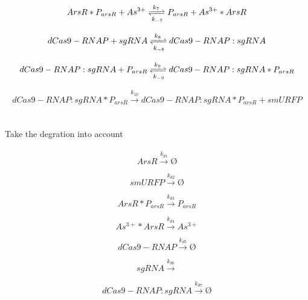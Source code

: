 \begin{equation}
ArsR*P_{arsR} +As^{3+}\xrightleftharpoons[k_{-7}]{k_7}P_{arsR}+ As^{3+}*ArsR
\end{equation}

\begin{equation}
dCas9-RNAP+sgRNA\xrightleftharpoons[k_{-8}]{k_8} dCas9-RNAP:sgRNA
\end{equation}

\begin{equation}
dCas9-RNAP:sgRNA+P_{arsR}\xrightleftharpoons[k_{-9}]{k_9} dCas9-RNAP:sgRNA*P_{arsR}
\end{equation}

\begin{equation}
dCas9-RNAP:sgRNA*P_{arsR}\stackrel{k_{10}}{\longrightarrow} dCas9-RNAP:sgRNA*P_{arsR}+smURFP
\end{equation}
\\\\
Take the degration into account
\\\\
\begin{equation}
ArsR\stackrel{k_{d1}}{\longrightarrow}Ø
\end{equation}

\begin{equation}
smURFP\stackrel{k_{d2}}{\longrightarrow}Ø
\end{equation}


\begin{equation}
ArsR*P_{arsR}\stackrel{k_{d3}}{\longrightarrow}P_{arsR}
\end{equation}

\begin{equation}
As^{3+}*ArsR\stackrel{k_{d4}}{\longrightarrow}As^{3+}
\end{equation}

\begin{equation}
dCas9-RNAP\stackrel{k_{d5}}{\longrightarrow}Ø
\end{equation}

\begin{equation}
sgRNA\stackrel{k_{d6}}{\longrightarrow}
\end{equation}


\begin{equation}
dCas9-RNAP:sgRNA\stackrel{k_{d7}}{\longrightarrow}Ø
\end{equation}

